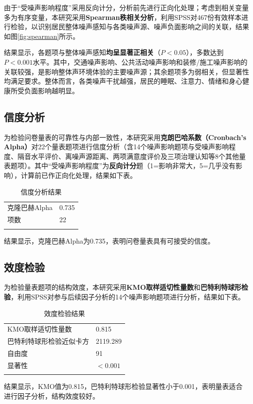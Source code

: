 由于“受噪声影响程度”采用反向计分，分析前先进行正向化处理；考虑到相关变量多为有序变量，本研究采用\textbf{Spearman秩相关分析}，利用SPSS对467份有效样本进行检验，以识别居民整体噪声感知与各类噪声源、噪声负面影响之间的关联，结果如图\ref{fig:spearman}所示。


结果显示，各题项与整体噪声感知\textbf{均呈显著正相关}（$P<0.05$），多数达到$P<0.001$水平。其中，交通噪声影响、公共活动噪声影响和装修/施工噪声影响的关联较强，是影响整体声环境体验的主要噪声源；其余题项多为弱相关，但显著性均满足要求。整体而言，各类噪声干扰越强，居民的睡眠、注意力、情绪和身心健康所受负面影响越明显。

\subsection{信度分析}

为检验问卷量表的可靠性与内部一致性，本研究采用\textbf{克朗巴哈系数（Cronbach's Alpha）}对22个量表题项进行信度分析（含14个噪声影响题项与受噪声影响程度、隔音水平评价、离噪声源距离、两项满意度评价及三项治理认知等8个其他量表题项）。其中“受噪声影响程度”为\textbf{反向计分}题（1=影响非常大，5=几乎没有影响），计算前已作正向化处理，结果如下表。

\begin{table}[H]
\centering
\caption{信度分析结果}
\begin{tabular}{M{8cm}M{5cm}}
\bluetoprule
{}
 &  \\
\hline
克隆巴赫Alpha & 0.735 \\
项数 & 22 \\
\bluebottomrule
\end{tabular}
\end{table}

结果显示，克隆巴赫Alpha为0.735，表明问卷量表具有可接受的信度。

\subsection{效度检验}

为检验量表题项的结构效度，本研究采用\textbf{KMO取样适切性量数}和\textbf{巴特利特球形检验}，利用SPSS对参与后续因子分析的14个噪声影响题项进行分析，结果如下表。

\begin{table}[H]
\centering
\caption{效度检验结果}
\begin{tabular}{M{8cm}M{5cm}}
\bluetoprule
{}
 &  \\
\hline
KMO取样适切性量数 & 0.815 \\
巴特利特球形检验近似卡方 & 2119.289 \\
自由度 & 91 \\
显著性 & $<0.001$ \\
\bluebottomrule
\end{tabular}
\end{table}

结果显示，KMO值为0.815，巴特利特球形检验显著性小于0.001，表明量表适合进行因子分析，结构效度较好。
